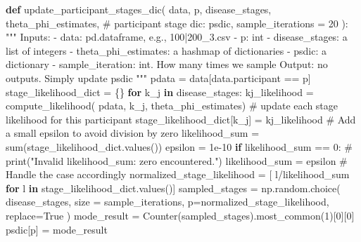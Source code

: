 \documentclass[
  letterpaper,
  DIV=11,
  numbers=noendperiod]{scrreprt}
\newenvironment{Shaded}{\begin{snugshade}}{\end{snugshade}}
\newcommand{\BuiltInTok}[1]{\textcolor[rgb]{0.00,0.23,0.31}{#1}}
\newcommand{\CommentTok}[1]{\textcolor[rgb]{0.37,0.37,0.37}{#1}}
\newcommand{\ControlFlowTok}[1]{\textcolor[rgb]{0.00,0.23,0.31}{\textbf{#1}}}
\newcommand{\DecValTok}[1]{\textcolor[rgb]{0.68,0.00,0.00}{#1}}
\newcommand{\FloatTok}[1]{\textcolor[rgb]{0.68,0.00,0.00}{#1}}
\newcommand{\KeywordTok}[1]{\textcolor[rgb]{0.00,0.23,0.31}{\textbf{#1}}}
\newcommand{\NormalTok}[1]{\textcolor[rgb]{0.00,0.23,0.31}{#1}}
\newcommand{\OperatorTok}[1]{\textcolor[rgb]{0.37,0.37,0.37}{#1}}
\newcommand{\VariableTok}[1]{\textcolor[rgb]{0.07,0.07,0.07}{#1}}
\begin{document}
\begin{Shaded}
\begin{Highlighting}[]
\KeywordTok{def}\NormalTok{ update\_participant\_stages\_dic(}
\NormalTok{        data,}
\NormalTok{        p,}
\NormalTok{        disease\_stages,}
\NormalTok{        theta\_phi\_estimates,}
        \CommentTok{\# participant stage dic:}
\NormalTok{        psdic,}
\NormalTok{        sample\_iterations }\OperatorTok{=} \DecValTok{20}
\NormalTok{):}
    \CommentTok{"""}
\CommentTok{    Inputs:}
\CommentTok{        {-} data: pd.dataframe, e.g., 100|200\_3.csv}
\CommentTok{        {-} p: int}
\CommentTok{        {-} disease\_stages: a list of integers}
\CommentTok{        {-} theta\_phi\_estimates: a hashmap of dictionaries}
\CommentTok{        {-} psdic: a dictionary}
\CommentTok{        {-} sample\_iteration: int. How many times we sample }
\CommentTok{    Output:}
\CommentTok{        no outputs. Simply update psdic}
\CommentTok{    """}
\NormalTok{    pdata }\OperatorTok{=}\NormalTok{ data[data.participant }\OperatorTok{==}\NormalTok{ p]}
\NormalTok{    stage\_likelihood\_dict }\OperatorTok{=}\NormalTok{ \{\}}
    \ControlFlowTok{for}\NormalTok{ k\_j }\KeywordTok{in}\NormalTok{ disease\_stages:}
\NormalTok{        kj\_likelihood }\OperatorTok{=}\NormalTok{ compute\_likelihood(}
\NormalTok{            pdata, k\_j, theta\_phi\_estimates)}
        \CommentTok{\# update each stage likelihood for this participant}
\NormalTok{        stage\_likelihood\_dict[k\_j] }\OperatorTok{=}\NormalTok{ kj\_likelihood}
    \CommentTok{\# Add a small epsilon to avoid division by zero}
\NormalTok{    likelihood\_sum }\OperatorTok{=} \BuiltInTok{sum}\NormalTok{(stage\_likelihood\_dict.values())}
\NormalTok{    epsilon }\OperatorTok{=} \FloatTok{1e{-}10}
    \ControlFlowTok{if}\NormalTok{ likelihood\_sum }\OperatorTok{==} \DecValTok{0}\NormalTok{:}
        \CommentTok{\# print("Invalid likelihood\_sum: zero encountered.")}
\NormalTok{        likelihood\_sum }\OperatorTok{=}\NormalTok{ epsilon  }\CommentTok{\# Handle the case accordingly}
\NormalTok{    normalized\_stage\_likelihood }\OperatorTok{=}\NormalTok{ [}
\NormalTok{        l}\OperatorTok{/}\NormalTok{likelihood\_sum }\ControlFlowTok{for}\NormalTok{ l }\KeywordTok{in}\NormalTok{ stage\_likelihood\_dict.values()]}
\NormalTok{    sampled\_stages }\OperatorTok{=}\NormalTok{ np.random.choice(}
\NormalTok{        disease\_stages, }
\NormalTok{        size }\OperatorTok{=}\NormalTok{ sample\_iterations, }
\NormalTok{        p}\OperatorTok{=}\NormalTok{normalized\_stage\_likelihood, }
\NormalTok{        replace}\OperatorTok{=}\VariableTok{True}
\NormalTok{    )}
\NormalTok{    mode\_result }\OperatorTok{=}\NormalTok{ Counter(sampled\_stages).most\_common(}\DecValTok{1}\NormalTok{)[}\DecValTok{0}\NormalTok{][}\DecValTok{0}\NormalTok{]}
\NormalTok{    psdic[p] }\OperatorTok{=}\NormalTok{ mode\_result}
\end{Highlighting}
\end{Shaded}
\end{document}
